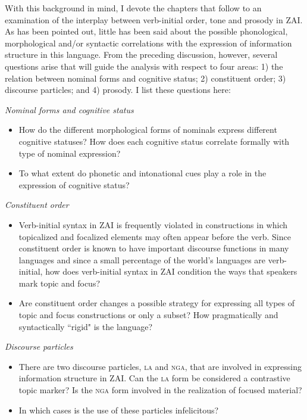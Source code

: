 With this background in mind, I devote the chapters that follow to an examination of the interplay between verb-initial order, tone and prosody in ZAI. As has been pointed out, little has been said about the possible phonological, morphological and/or syntactic correlations with the expression of information structure in this language. From the preceding discussion, however, several questions arise that will guide the analysis with respect to four areas: 1) the relation between nominal forms and cognitive status; 2) constituent order; 3) discourse particles; and 4) prosody. I list these questions here: 

\singlespacing
\vspace{3mm}
\noindent \textit{Nominal forms and cognitive status}
\begin{itemize}
\item How do the different morphological forms of nominals express different cognitive statuses? How does each cognitive status correlate formally with type of nominal expression?
\item To what extent do phonetic and intonational cues play a role in the expression of cognitive status?
\end{itemize}

\vspace{3mm}
\noindent \textit{Constituent order}
\begin{itemize}
\item Verb-initial syntax in ZAI is frequently violated in constructions in which topicalized and focalized elements may often appear before the verb. Since constituent order is known to have important discourse functions in many languages and since a small percentage of the world's languages are verb-initial, how does verb-initial syntax in ZAI condition the ways that speakers mark topic and focus? 
\item Are constituent order changes a possible strategy for expressing all types of topic and focus constructions or only a subset? How pragmatically and syntactically ``rigid" is the language?
\end{itemize}

\vspace{3mm}
\noindent \textit{Discourse particles}
\begin{itemize}
\item There are two discourse particles, \textsc{la} and \textsc{nga}, that are involved in expressing information structure in ZAI. Can the \textsc{la} form be considered a contrastive topic marker? Is the \textsc{nga} form involved in the realization of focused material? 
\item In which cases is the use of these particles infelicitous?
\end{itemize}

